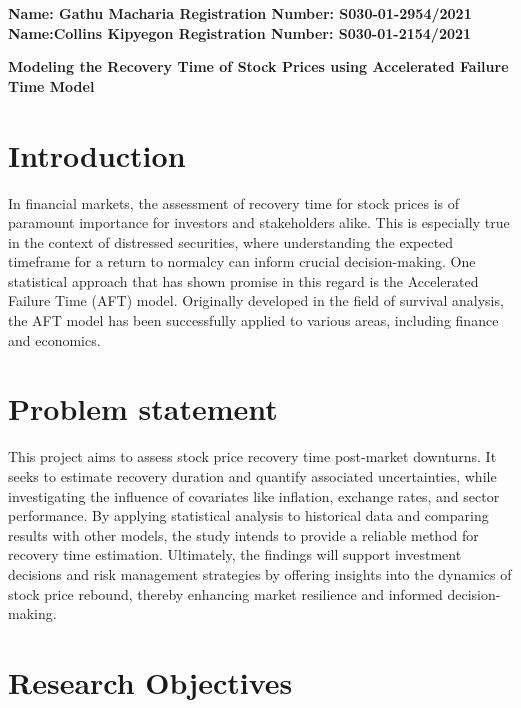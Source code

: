 \documentclass[twoside,a4paper,12pt]{article}
\begin{document}
	
	\begin{flushleft} 
			\large{\bf{Name: Gathu Macharia     Registration Number: S030-01-2954/2021\\
					   Name:Collins Kipyegon        Registration Number: S030-01-2154/2021\\}} \vspace*{0.75in}
	\end{flushleft}
	
	\begin{center} \Large{ \bf{Modeling the Recovery Time of Stock Prices using Accelerated Failure Time Model }} \end{center}	


\section*{Introduction}In financial markets, the assessment of recovery time for stock prices is of paramount importance for investors and stakeholders alike. This is especially true in the context of distressed securities, where understanding the expected timeframe for a return to normalcy can inform crucial decision-making. One statistical approach that has shown promise in this regard is the Accelerated Failure Time (AFT) model. Originally developed in the field of survival analysis, the AFT model has been successfully applied to various areas, including finance and economics.

\section*{Problem statement}This project aims to assess stock price recovery time post-market downturns. It seeks to estimate recovery duration and quantify associated uncertainties, while investigating the influence of covariates like inflation, exchange rates, and sector performance. By applying statistical analysis to historical data and comparing results with other models, the study intends to provide a reliable method for recovery time estimation. Ultimately, the findings will support investment decisions and risk management strategies by offering insights into the dynamics of stock price rebound, thereby enhancing market resilience and informed decision-making.




\section*{Research Objectives} 
\end{document}
